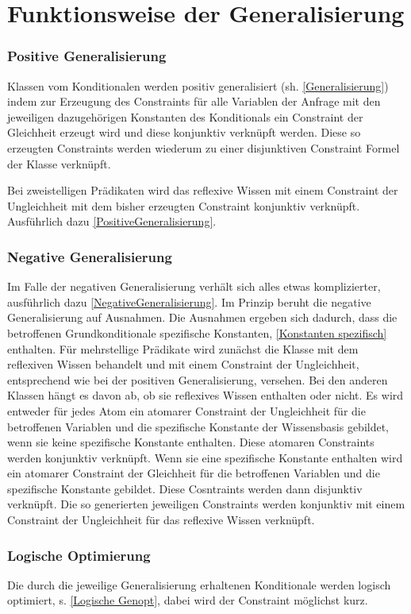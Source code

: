 \documentclass[draft]{scrreprt}
\begin{document}
\label{general}
\section{Funktionsweise der Generalisierung} 
\subsubsection{Positive Generalisierung}  \label{Funktion positiv}
Klassen vom Konditionalen werden positiv generalisiert (sh. \ref{Generalisierung}) indem zur Erzeugung des Constraints für alle Variablen der Anfrage mit den jeweiligen dazugehörigen Konstanten des Konditionals ein Constraint der Gleichheit erzeugt wird und diese konjunktiv verknüpft werden. Diese so erzeugten Constraints werden wiederum zu einer disjunktiven Constraint Formel der Klasse verknüpft.{ Bei zweistelligen Prädikaten wird das reflexive Wissen mit einem Constraint der Ungleichheit mit dem bisher erzeugten Constraint konjunktiv verknüpft. Ausführlich dazu \ref{PositiveGeneralisierung}.
\subsubsection{Negative Generalisierung}  \label{Funktion negativ}
Im Falle der negativen Generalisierung verhält sich alles etwas komplizierter, ausführlich dazu \ref{NegativeGeneralisierung}. 
Im Prinzip beruht die negative Generalisierung auf Ausnahmen. Die Ausnahmen ergeben sich dadurch, dass die betroffenen Grundkonditionale spezifische Konstanten, \ref{Konstanten spezifisch} enthalten. Für mehrstellige Prädikate wird zunächst die Klasse mit dem reflexiven Wissen behandelt und mit einem Constraint der Ungleichheit, entsprechend wie bei der positiven Generalisierung, versehen. Bei den anderen Klassen hängt es davon ab, ob sie reflexives Wissen enthalten oder nicht. Es wird entweder für jedes Atom ein atomarer Constraint der Ungleichheit für die betroffenen Variablen und die spezifische Konstante der Wissensbasis gebildet, wenn sie keine spezifische Konstante enthalten. Diese atomaren Constraints werden konjunktiv verknüpft. Wenn sie eine spezifische Konstante enthalten wird ein atomarer Constraint der Gleichheit für die betroffenen Variablen und die spezifische Konstante gebildet. Diese Cosntraints werden dann disjunktiv verknüpft. Die so generierten jeweiligen Constraints werden konjunktiv mit einem Constraint der Ungleichheit für das reflexive Wissen verknüpft.
\subsubsection{Logische Optimierung}
Die durch die jeweilige Generalisierung erhaltenen Konditionale werden logisch optimiert, s. \ref{Logische Genopt}, dabei wird der Constraint möglichst kurz. 
}
\end{document}
